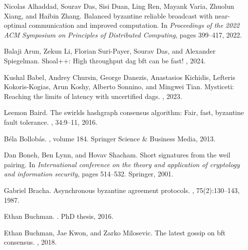 

 
 
 

\begin{thebibliography}{10}

Nicolas Alhaddad, Sourav Das, Sisi Duan, Ling Ren, Mayank Varia, Zhuolun Xiang,
  and Haibin Zhang.
\newblock Balanced byzantine reliable broadcast with near-optimal communication
  and improved computation.
\newblock In {\em Proceedings of the 2022 ACM Symposium on Principles of
  Distributed Computing}, pages 399--417, 2022.

Balaji Arun, Zekun Li, Florian Suri-Payer, Sourav Das, and Alexander
  Spiegelman.
\newblock Shoal++: High throughput dag bft can be fast!
, 2024.

Kushal Babel, Andrey Chursin, George Danezis, Anastasios Kichidis, Lefteris
  Kokoris-Kogias, Arun Koshy, Alberto Sonnino, and Mingwei Tian.
\newblock Mysticeti: Reaching the limits of latency with uncertified dags.
, 2023.

Leemon Baird.
\newblock The swirlds hashgraph consensus algorithm: Fair, fast, byzantine
  fault tolerance.
, 34:9--11,
  2016.

B{\'e}la Bollob{\'a}s.
, volume 184.
\newblock Springer Science \& Business Media, 2013.

Dan Boneh, Ben Lynn, and Hovav Shacham.
\newblock Short signatures from the weil pairing.
\newblock In {\em International conference on the theory and application of
  cryptology and information security}, pages 514--532. Springer, 2001.

Gabriel Bracha.
\newblock Asynchronous byzantine agreement protocols.
, 75(2):130--143, 1987.

Ethan Buchman.
.
\newblock PhD thesis, 2016.

Ethan Buchman, Jae Kwon, and Zarko Milosevic.
\newblock The latest gossip on bft consensus.
, 2018.


\end{thebibliography}

